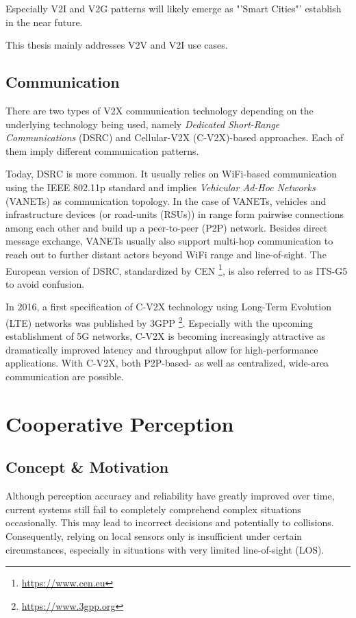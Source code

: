 Especially V2I and V2G patterns will likely emerge as "'Smart Cities"' establish in the near future.

This thesis mainly addresses V2V and V2I use cases.

\subsection{Communication}
\label{subsec:background:communication}
There are two types of V2X communication technology depending on the underlying technology being used, namely \textit{Dedicated Short-Range Communications} (DSRC) and Cellular-V2X (C-V2X)-based approaches. Each of them imply different communication patterns.

Today, DSRC is more common. It usually relies on WiFi-based communication using the IEEE 802.11p standard and implies \textit{Vehicular Ad-Hoc Networks} (VANETs) as communication topology. In the case of VANETs, vehicles and infrastructure devices (or road-units (RSUs)) in range form pairwise connections among each other and build up a peer-to-peer (P2P) network. Besides direct message exchange, VANETs usually also support multi-hop communication to reach out to further distant actors beyond WiFi range and line-of-sight. The European version of DSRC, standardized by CEN \footnote{\url{https://www.cen.eu}}, is also referred to as ITS-G5 to avoid confusion. 

In 2016, a first specification of C-V2X technology using Long-Term Evolution (LTE) networks was published by 3GPP \footnote{\url{https://www.3gpp.org}}. Especially with the upcoming establishment of 5G networks, C-V2X is becoming increasingly attractive as dramatically improved latency and throughput allow for high-performance applications. With C-V2X, both P2P-based- as well as centralized, wide-area communication are possible. 

\section{Cooperative Perception}
\label{sec:background:cooperative_perception}

\subsection{Concept \& Motivation}
\label{subsec:background:concept_motivation}
Although perception accuracy and reliability have greatly improved over time, current systems still fail to completely comprehend complex situations occasionally. This may lead to incorrect decisions and potentially to collisions. Consequently, relying on local sensors only is insufficient under certain circumstances, especially in situations with very limited line-of-sight (LOS).

